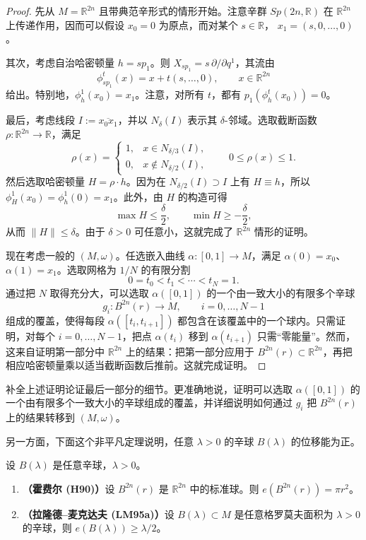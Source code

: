 \begin{proof}
先从 $M=\mathbb R^{2n}$ 且带典范辛形式的情形开始。注意辛群
$Sp(2n,\mathbb R)$ 在 $\mathbb R^{2n}$ 上传递作用，因而可以假设
$x_0=0$ 为原点，而对某个 $s\in\mathbb R$，
$x_1=(s,0,\ldots,0)$。

其次，考虑自治哈密顿量 $h=sp_1$。则
$X_{sp_1}=s\,\partial/\partial q^1$，其流由
\[
 \phi_{sp_1}^t(x)=x+t(s,\ldots,0),
 \qquad x\in\mathbb R^{2n}
\]
给出。特别地，$\phi_h^1(x_0)=x_1$。注意，对所有 $t$，都有
$p_1(\phi_h^t(x_0))=0$。

最后，考虑线段 $I:=\overline{x_0x_1}$，并以 $N_\delta(I)$ 表示其
$\delta$-邻域。选取截断函数 $\rho:\mathbb R^{2n}\to\mathbb R$，满足
\[
 \rho(x)=
 \begin{cases}
  1,&x\in N_{\delta/3}(I),\\
  0,&x\notin N_{\delta/2}(I),
 \end{cases}
 \qquad 0\leq\rho(x)\leq1.
\]
然后选取哈密顿量 $H=\rho\cdot h$。因为在
$N_{\delta/2}(I)\supset I$ 上有 $H\equiv h$，所以
$\phi_H^1(x_0)=\phi_h^1(0)=x_1$。此外，由 $H$ 的构造可得
\[
 \max H\leq\frac\delta2,
 \qquad
 \min H\geq-\frac\delta2,
\]
从而 $\|H\|\leq\delta$。由于 $\delta>0$ 可任意小，这就完成了
$\mathbb R^{2n}$ 情形的证明。

现在考虑一般的 $(M,\omega)$。任选嵌入曲线
$\alpha:[0,1]\to M$，满足 $\alpha(0)=x_0$、$\alpha(1)=x_1$。选取网格为
$1/N$ 的有限分割
\[
 0=t_0<t_1<\cdots<t_N=1.
\]
通过把 $N$ 取得充分大，可以选取 $\alpha([0,1])$ 的一个由一致大小的有限多个辛球
\[
 g_i:B^{2n}(r)\to M,
 \qquad i=0,\ldots,N-1
\]
组成的覆盖，使得每段 $\alpha([t_i,t_{i+1}])$ 都包含在该覆盖中的一个球内。只需证明，对每个 $i=0,\ldots,N-1$，把点
$\alpha(t_i)$ 移到 $\alpha(t_{i+1})$ 只需“零能量”。然而，这来自证明第一部分中 $\mathbb R^{2n}$ 上的结果：把第一部分应用于
$B^{2n}(r)\subset\mathbb R^{2n}$，再把相应哈密顿量乘以适当截断函数后推前。这就完成证明。
\end{proof}

\begin{exercise}\label{ex:point-displacement-proof-details}
补全上述证明论证最后一部分的细节。更准确地说，证明可以选取
$\alpha([0,1])$ 的一个由有限多个一致大小的辛球组成的覆盖，并详细说明如何通过 $g_i$ 把 $B^{2n}(r)$ 上的结果转移到 $(M,\omega)$。
\end{exercise}

另一方面，下面这个非平凡定理说明，任意 $\lambda>0$ 的辛球
$B(\lambda)$ 的位移能为正。

\begin{theorem}\label{thm:energy-capacity-basic}
设 $B(\lambda)$ 是任意辛球，$\lambda>0$。
\begin{enumerate}[label=(\arabic*)]
 \item \textup{\bfseries（霍费尔 (H90)）}设 $B^{2n}(r)$ 是 $\mathbb R^{2n}$ 中的标准球。则
 $e(B^{2n}(r))=\pi r^2$。
 \item \textup{\bfseries（拉隆德--麦克达夫 (LM95a)）}设 $B(\lambda)\subset M$ 是任意格罗莫夫面积为 $\lambda>0$ 的辛球，则
 $e(B(\lambda))\geq\lambda/2$。
\end{enumerate}
\end{theorem}


